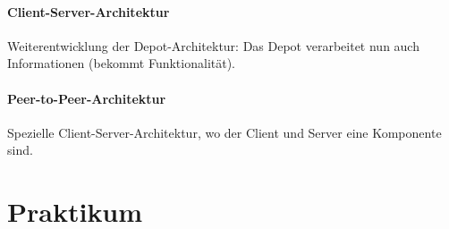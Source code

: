 \documentclass{scrreprt}
\begin{document}
\subsection{Client-Server-Architektur}
Weiterentwicklung der Depot-Architektur: Das Depot verarbeitet nun auch Informationen (bekommt Funktionalität).

\subsection{Peer-to-Peer-Architektur}
Spezielle Client-Server-Architektur, wo der Client und Server eine Komponente sind.


\part{Praktikum}
\setcounter{chapter}{0}

\end{document}
